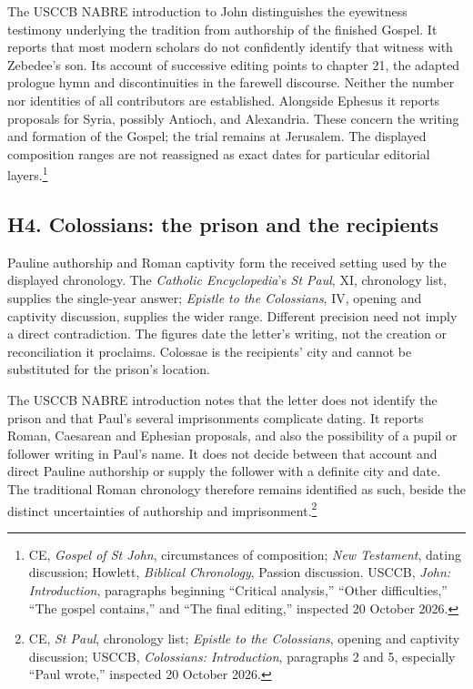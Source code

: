 The USCCB NABRE introduction to John distinguishes the eyewitness testimony underlying the tradition from authorship of the finished Gospel. It reports that most modern scholars do not confidently identify that witness with Zebedee's son. Its account of successive editing points to chapter 21, the adapted prologue hymn and discontinuities in the farewell discourse. Neither the number nor identities of all contributors are established. Alongside Ephesus it reports proposals for Syria, possibly Antioch, and Alexandria. These concern the writing and formation of the Gospel; the trial remains at Jerusalem. The displayed composition ranges are not reassigned as exact dates for particular editorial layers.\footnote{CE, \emph{Gospel of St John}, circumstances of composition; \emph{New Testament}, dating discussion; Howlett, \emph{Biblical Chronology}, Passion discussion. USCCB, \emph{John: Introduction}, paragraphs beginning ``Critical analysis,'' ``Other difficulties,'' ``The gospel contains,'' and ``The final editing,'' inspected 20 October 2026.}

\subsection{H4. Colossians: the prison and the recipients}
\label{history-colossians}
Pauline authorship and Roman captivity form the received setting used by the displayed chronology. The \emph{Catholic Encyclopedia}'s \emph{St Paul}, XI, chronology list, supplies the single-year answer; \emph{Epistle to the Colossians}, IV, opening and captivity discussion, supplies the wider range. Different precision need not imply a direct contradiction. The figures date the letter's writing, not the creation or reconciliation it proclaims. Colossae is the recipients' city and cannot be substituted for the prison's location.

The USCCB NABRE introduction notes that the letter does not identify the prison and that Paul's several imprisonments complicate dating. It reports Roman, Caesarean and Ephesian proposals, and also the possibility of a pupil or follower writing in Paul's name. It does not decide between that account and direct Pauline authorship or supply the follower with a definite city and date. The traditional Roman chronology therefore remains identified as such, beside the distinct uncertainties of authorship and imprisonment.\footnote{CE, \emph{St Paul}, chronology list; \emph{Epistle to the Colossians}, opening and captivity discussion; USCCB, \emph{Colossians: Introduction}, paragraphs 2 and 5, especially ``Paul wrote,'' inspected 20 October 2026.}

